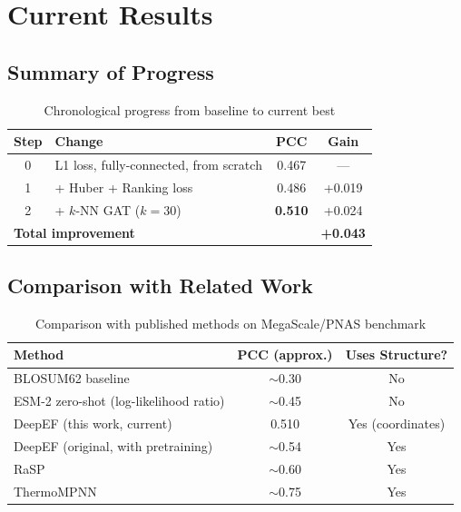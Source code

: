 \chapter{Current Results}
\label{ch:results}

\section{Summary of Progress}

\begin{table}[h]
\centering
\caption{Chronological progress from baseline to current best}
\label{tab:progress}
\begin{tabular}{clcc}
\toprule
\textbf{Step} & \textbf{Change} & \textbf{PCC} & \textbf{Gain} \\
\midrule
0 & L1 loss, fully-connected, from scratch & 0.467 & --- \\
1 & + Huber + Ranking loss & 0.486 & +0.019 \\
2 & + $k$-NN GAT ($k=30$) & \textbf{0.510} & +0.024 \\
\midrule
\multicolumn{2}{l}{\textbf{Total improvement}} & & \textbf{+0.043} \\
\bottomrule
\end{tabular}
\end{table}

\section{Comparison with Related Work}

\begin{table}[h]
\centering
\caption{Comparison with published methods on MegaScale/PNAS benchmark}
\label{tab:comparison}
\begin{tabular}{lcc}
\toprule
\textbf{Method} & \textbf{PCC (approx.)} & \textbf{Uses Structure?} \\
\midrule
BLOSUM62 baseline & $\sim$0.30 & No \\
ESM-2 zero-shot (log-likelihood ratio) & $\sim$0.45 & No \\
DeepEF (this work, current) & 0.510 & Yes (coordinates) \\
DeepEF (original, with pretraining) & $\sim$0.54 & Yes \\
RaSP & $\sim$0.60 & Yes \\
ThermoMPNN & $\sim$0.75 & Yes \\
\bottomrule
\end{tabular}
\end{table}

